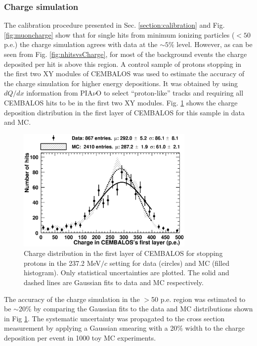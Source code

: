 \subsubsection{\bf Charge simulation}
The calibration procedure presented in Sec. \ref{section:calibration} and Fig. \ref{fig:muoncharge} show that for single hits from minimum ionizing particles ($<50$ p.e.) the charge simulation agrees with data at the $\sim5$\% level. However, as can be seen from Fig. \ref{fig:nhitsvsCharge}, for most of the background events the charge deposited per hit is above this region. A control sample of protons stopping in the first two XY modules of CEMBALOS was used to estimate the accuracy of the charge simulation for higher energy depositions. It was obtained by using $dQ/dx$ information from PIA$\nu$O to select ``proton-like'' tracks and requiring all CEMBALOS hits to be in the first two XY modules. Fig. \ref{fig:proton_sample} shows the charge deposition distribution in the first layer of CEMBALOS for this sample in data and MC.
\begin{figure}[ht]
 \includegraphics[width=86mm]{figures/proton_contained_1stlayer.eps}
 \caption{Charge distribution in the first layer of CEMBALOS for stopping protons in the 237.2 MeV$/c$ setting for data (circles) and MC (filled histogram). Only statistical uncertainties are plotted. The solid and dashed lines are Gaussian fits to data and MC respectively.}
 \label{fig:proton_sample}
\end{figure}

The accuracy of the charge simulation in the $>$50 p.e. region was estimated to be $\sim$20\% by comparing the Gaussian fits to the data and MC distributions shown in Fig \ref{fig:proton_sample}. The systematic uncertainty was propagated to the cross section measurement by applying a Gaussian smearing with a 20\% width to the charge deposition per event in 1000 toy MC experiments.

